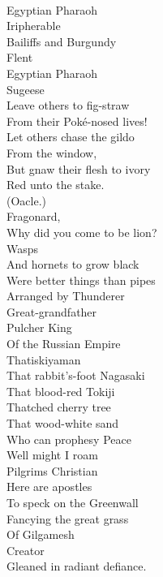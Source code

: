 \documentclass[smalldemyvopaper,11pt,twoside,onecolumn,openright,extrafontsizes]{memoir}
\begin{document}
\\Egyptian Pharaoh
\\Iripherable
\\Bailiffs and Burgundy
\\Flent
\\Egyptian Pharaoh
\\Sugeese
\\Leave others to fig-straw
\\From their Poké-nosed lives!
\\Let others chase the gildo
\\From the window,
\\But gnaw their flesh to ivory
\\Red unto the stake.
\\(Oacle.)
\\Fragonard,
\\Why did you come to be lion?
\\Wasps
\\And hornets to grow black
\\Were better things than pipes
\\Arranged by Thunderer
\\Great-grandfather
\\Pulcher King
\\Of the Russian Empire
\\Thatiskiyaman
\\That rabbit's-foot Nagasaki
\\That blood-red Tokiji
\\Thatched cherry tree
\\That wood-white sand
\\Who can prophesy Peace
\\Well might I roam
\\Pilgrims Christian
\\Here are apostles
\\To speck on the Greenwall
\\Fancying the great grass
\\Of Gilgamesh
\\Creator
\\Gleaned in radiant defiance.
\end{document}
